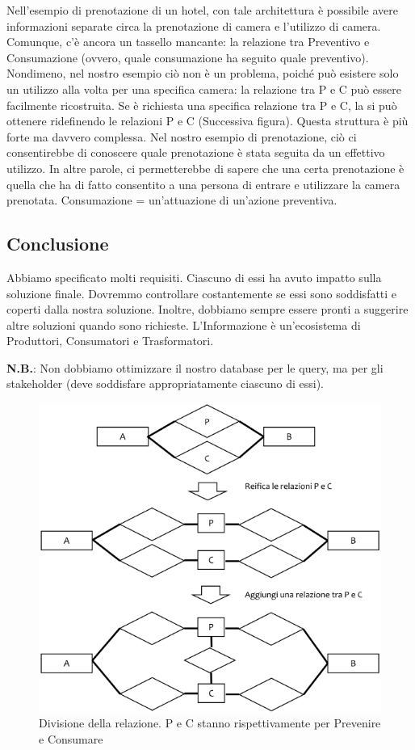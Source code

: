 Nell’esempio di prenotazione di un hotel, con tale architettura è possibile avere informazioni separate circa la prenotazione di camera e l’utilizzo di camera. Comunque, c’è ancora un tassello mancante: la relazione tra Preventivo e Consumazione (ovvero, quale consumazione ha seguito quale preventivo). Nondimeno, nel nostro esempio ciò non è un problema, poiché può esistere solo un utilizzo alla volta per una specifica camera: la relazione tra P e C può essere facilmente ricostruita. Se è richiesta una specifica relazione tra P e C, la si può ottenere ridefinendo le relazioni P e C (Successiva figura). Questa struttura è più forte ma davvero complessa. Nel nostro esempio di prenotazione, ciò ci consentirebbe di conoscere quale prenotazione è stata seguita da un effettivo utilizzo. In altre parole, ci permetterebbe di sapere che una certa prenotazione è quella che ha di fatto consentito a una persona di entrare e utilizzare la camera prenotata. Consumazione = un’attuazione di un’azione preventiva. 

\subsection{Conclusione}

 Abbiamo specificato molti requisiti. Ciascuno di essi ha avuto impatto sulla soluzione finale. Dovremmo controllare costantemente se essi sono soddisfatti e coperti dalla nostra soluzione. Inoltre, dobbiamo sempre essere pronti a suggerire altre soluzioni quando sono richieste. L’Informazione è un’ecosistema di Produttori, Consumatori e Trasformatori.
 
\textbf{N.B.}: Non dobbiamo ottimizzare il nostro database per le query, ma per gli stakeholder (deve soddisfare appropriatamente ciascuno di essi). 

\begin{center}
\begin{figure}[H]
\centering
\includegraphics[scale=1]{figures/prevconEXP.png}
\caption{ Divisione della relazione. P e C stanno rispettivamente per Prevenire e Consumare} 
\end{figure}
\end{center}

